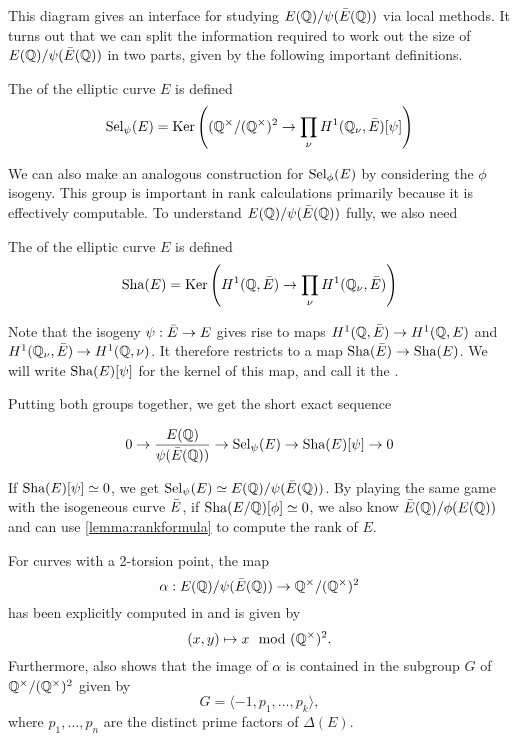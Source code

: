 \documentclass[12pt, a4paper]{report}
\begin{document}
This diagram gives an interface for studying $E({\mathbb Q})/\psi(\bar{E}({\mathbb Q}))$ via
local methods. It turns out that we can split the information required to work
out the size of $E({\mathbb Q})/\psi(\bar{E}({\mathbb Q}))$ in two parts, given by the following
important definitions.

\begin{defn}
  The  of the elliptic curve $E$ is defined
  $$\text{\normalfont Sel}_\psi(E) = \text{Ker}\left(({\mathbb Q}^{\times}/({\mathbb Q}^{\times})^2 \rightarrow
  \prod\limits_\nu H^1({\mathbb Q}_\nu, \bar{E})[\psi]\right)$$
\end{defn}

We can also make an analogous construction for $\text{\normalfont Sel}_\phi(E)$ by
considering the $\phi$ isogeny. 
This group is important in rank calculations primarily because it is effectively
computable. To understand $E({\mathbb Q})/\psi(\bar{E}({\mathbb Q}))$ fully, we also need

\begin{defn} \label{defn:sha}
  The  of the elliptic curve $E$ is defined
  $$ \text{\normalfont Sha}(E) = \text{Ker} 
  \left(H^1({\mathbb Q}, \bar{E}) \rightarrow \prod\limits_\nu H^1 ({\mathbb Q}_\nu,
  \bar{E})\right) $$
\end{defn}
Note that the isogeny $\psi: \bar{E} \rightarrow E$ gives rise to maps $H^1({\mathbb Q},
\bar{E}) \rightarrow H^1({\mathbb Q},E)$ and $H^1({\mathbb Q}_\nu, \bar{E}) \rightarrow H^1({\mathbb Q}, \nu)$. It
therefore restricts to a map $\text{\normalfont Sha}(\bar{E}) \rightarrow \text{\normalfont Sha}(E)$. We will write
$\text{\normalfont Sha}(E)[\psi]$ for the kernel of this map, and call it the
.

Putting both groups together, we get the short exact sequence

\[ 0 \rightarrow \frac{E({\mathbb Q})}{\psi(\bar{E}({\mathbb Q}))} \rightarrow \text{\normalfont Sel}_\psi(E) \rightarrow \text{\normalfont Sha}(E)[\psi]
  \rightarrow 0\]

If $\text{\normalfont Sha}(E)[\psi] \simeq 0$, we get
$\text{\normalfont Sel}_\psi(E) \simeq E({\mathbb Q})/\psi(\bar{E}({\mathbb Q}))$. By playing
the same game with the isogeneous curve $\bar{E}$, if $\text{\normalfont Sha}(E/{\mathbb Q})[\phi] \simeq 0$,
we also know $\bar{E}({\mathbb Q})/\phi(E({\mathbb Q}))$ and can use \ref{lemma:rankformula} to compute
the rank of $E$. 

For curves with a 2-torsion point, the map 
$$\alpha : E({\mathbb Q}) / \psi(\bar{E}({\mathbb Q})) \rightarrow {\mathbb Q}^\times / ({\mathbb Q}^\times)^2$$ has been
explicitly computed in \cite[Page 91]{rational} and
is given by
$$(x,y) \mapsto x \mod ({\mathbb Q}^\times)^2.$$
Furthermore, \cite[Pages 85-87]{rational} also shows that the image of $\alpha$ is
contained in the subgroup $G$ of ${\mathbb Q}^\times / ({\mathbb Q}^\times)^2$ given by 
\[G = \langle -1, p_1, \dots, p_k  \rangle,\]
where $p_1, \dots, p_n$ are the distinct prime factors of $\Delta(E).$
\end{document}
